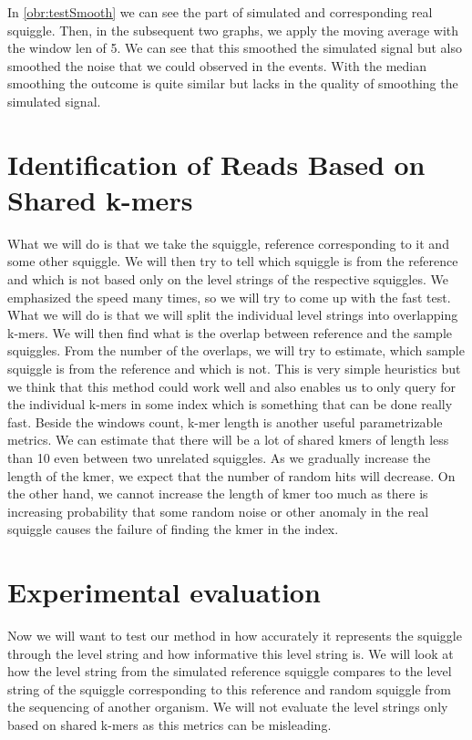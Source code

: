 In \ref{obr:testSmooth} we can see the part of simulated and corresponding real squiggle.
Then, in the subsequent two graphs, we apply the moving average with the window len
of 5. We can see that this smoothed the simulated signal but also smoothed the noise
that we could observed in the events. With the median smoothing the outcome is quite
similar but lacks in the quality of smoothing the simulated signal.

\section{Identification of Reads Based on Shared k-mers}

What we will do is that we take the squiggle, reference corresponding to it and
some other squiggle. We will then try to tell which squiggle is from the reference
and which is not based only on the level strings of the respective squiggles. We
emphasized the speed many times, so we will try to come up with the fast test.
What we will do is that we will split the
individual level strings into overlapping k-mers. We will then find what is the overlap
between reference and the sample squiggles. From the number of the overlaps, we will try
to estimate, which sample squiggle is from the reference and which is not. This is very
simple heuristics but we think that this method could work well and also enables us
to only query for the individual k-mers in some index which is something that can be done really fast.
Beside the windows count, k-mer length is another useful parametrizable metrics. We can estimate
that there will be a lot of shared kmers of length less than 10 even between two unrelated
squiggles. As we gradually increase the length of the kmer, we expect that the number
of random hits will decrease. On the other hand, we cannot increase the length of kmer
too much as there is increasing probability that some random noise or other anomaly
in the real squiggle causes the failure of finding the kmer in the index.

\section{Experimental evaluation}

Now we will want to test our method in how accurately it represents the squiggle
through the level string and how informative this level string is. We will
look at how the level string from the simulated reference squiggle compares to the
level string of the squiggle corresponding to this reference and random squiggle
from the sequencing of another organism. We will not evaluate the level strings
only based on shared k-mers as this metrics can be misleading.

